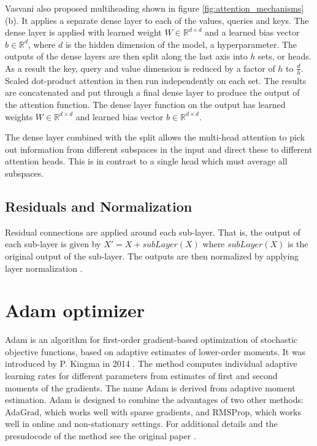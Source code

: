 Vasvani \cite{vaswani2017attention} also proposed multiheading shown in figure \ref{fig:attention_mechanisms} (b). It applies a separate dense layer to each of the values, queries and keys. The dense layer is applied with learned weight $W \in \mathbb{R}^{d \times d}$ and a learned bias vector $b \in \mathbb{R}^d$, where $d$ is the hidden dimension of the model, a hyperparameter. The outputs of the dense layers are then split along the last axis into $h$ sets, or heads. As a result the key, query and value dimension is reduced by a factor of $h$ to $\frac{d}{h}$. Scaled dot-product attention in then run independently on each set. The results are concatenated and put through a final dense layer to produce the output of the attention function. The dense layer function on the output has learned weights $W \in \mathbb{R}^{d \times d}$ and learned bias vector $b \in \mathbb{R}^{d \times d}$.

\hfill \break

The dense layer combined with the split allows the multi-head attention to pick out information from different subspaces in the input and direct these to different attention heads. This is in contrast to a single head which must average all subspaces.

\subsection{Residuals and Normalization}
Residual connections \cite{residual_connections} are applied around each sub-layer. That is, the output of each sub-layer is given by $X' = X + subLayer(X)$ where $subLayer(X)$ is the original output of the sub-layer. The outputs are then normalized by applying layer normalization \cite{layer_normalization}.

\section{Adam optimizer}
Adam is an algorithm for first-order gradient-based optimization of
stochastic objective functions, based on adaptive estimates of lower-order moments. It was introduced by P. Kingma in 2014 \cite{adam_optimizer}. The method computes individual adaptive learning rates for
different parameters from estimates of first and second moments of the gradients. The name Adam
is derived from adaptive moment estimation. Adam is designed to combine the advantages
of two other methods: AdaGrad, which works well with sparse gradients, and RMSProp, which works well in online and non-stationary
settings. For additional details and the presudocode of the method see the original paper \cite{adam_optimizer}.

